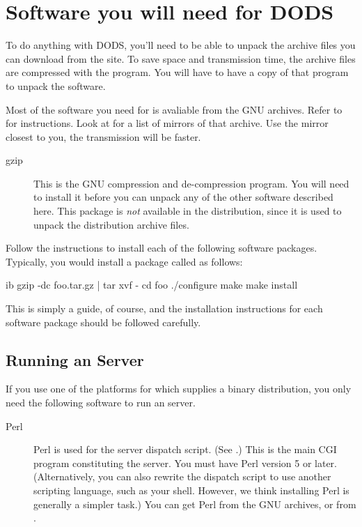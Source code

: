 %
%

\chapter{Software you will need for DODS}
\label{req-software}


To do anything with DODS, you'll need to be able to unpack the archive
files you can download from the \opendap site.  To save space and
transmission time, the archive files are compressed with the
 program.  You will have to have a copy of that program to
unpack the \opendap software.

Most of the software you need for \opendap is avaliable from the GNU
archives.  Refer to  for
instructions.  Look at
for a list of mirrors of that archive.  Use the mirror closest
to you, the transmission will be faster.

\begin{description}
\item[gzip] This is the GNU compression and de-compression program.
  You will need to install it before you can unpack any of the other
  software described here.  This package is \emph{not}
  available in the \opendap distribution, since it is used to unpack the
  distribution archive files.
\end{description}

Follow the instructions to install each of the following software
packages.  Typically, you would install a package called  as
follows: 

\begin{vcode}{ib}
gzip -dc foo.tar.gz | tar xvf -
cd foo
./configure
make
make install
\end{vcode}

This is simply a guide, of course, and the installation instructions
for each software package should be followed carefully.


\section{Running an \opendap Server}

If you use one of the platforms for which \opendap supplies a binary
distribution, you only need the following software to run an \opendap
server. 

\begin{description}
\item[Perl] Perl is used for the server dispatch script.  (See
  .) This is the main CGI program
  constituting the \opendap server.  You must have Perl version 5 or
  later.  (Alternatively, you can also rewrite the dispatch script to
  use another scripting language, such as your shell.  However, we
  think installing Perl is generally a simpler task.)  You can get
  Perl from the GNU archives, or from
  .
\end{description}

